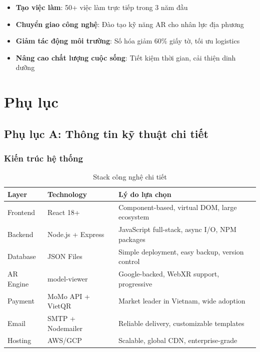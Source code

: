 \documentclass[12pt,a4paper]{article}
\begin{document}
\begin{itemize}[leftmargin=1cm]
    \item \textbf{Tạo việc làm}: 50+ việc làm trực tiếp trong 3 năm đầu
    \item \textbf{Chuyển giao công nghệ}: Đào tạo kỹ năng AR cho nhân lực địa phương
    \item \textbf{Giảm tác động môi trường}: Số hóa giảm 60\% giấy tờ, tối ưu logistics
    \item \textbf{Nâng cao chất lượng cuộc sống}: Tiết kiệm thời gian, cải thiện dinh dưỡng
\end{itemize}

\section{Phụ lục}

\subsection{Phụ lục A: Thông tin kỹ thuật chi tiết}

\subsubsection{Kiến trúc hệ thống}

\begin{table}[H]
\centering
\caption{Stack công nghệ chi tiết}
\label{tab:tech-stack}
\begin{tabular}{@{}>{\raggedright\arraybackslash}p{3cm}>{\raggedright\arraybackslash}p{4cm}>{\raggedright\arraybackslash}p{5cm}@{}}
\toprule
\textbf{Layer} & \textbf{Technology} & \textbf{Lý do lựa chọn} \\
\midrule
Frontend & React 18+ & Component-based, virtual DOM, large ecosystem \\
Backend & Node.js + Express & JavaScript full-stack, async I/O, NPM packages \\
Database & JSON Files & Simple deployment, easy backup, version control \\
AR Engine & model-viewer & Google-backed, WebXR support, progressive \\
Payment & MoMo API + VietQR & Market leader in Vietnam, wide adoption \\
Email & SMTP + Nodemailer & Reliable delivery, customizable templates \\
Hosting & AWS/GCP & Scalable, global CDN, enterprise-grade \\
\bottomrule
\end{tabular}
\end{table}
\end{document}
